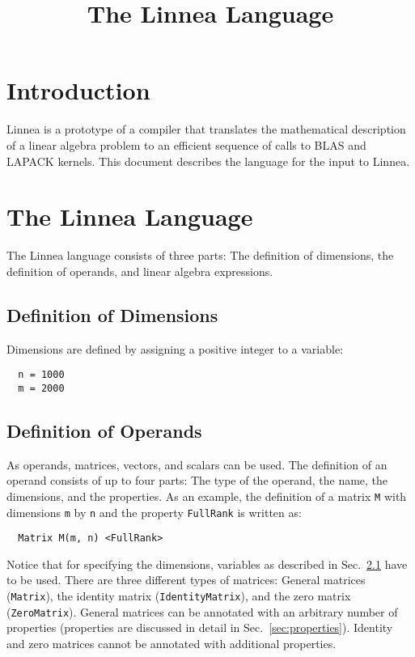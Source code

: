 \documentclass[
  12pt,
  a4paper,
]{scrartcl}
\title{The Linnea Language}
\begin{document}
\maketitle

\section{Introduction}

Linnea is a prototype of a compiler that translates the mathematical description of a linear algebra problem to an efficient sequence of calls to BLAS and LAPACK kernels.
This document describes the language for the input to Linnea.

\section{The Linnea Language}

The Linnea language consists of three parts: The definition of dimensions, the definition of operands, and linear algebra expressions.

\subsection{Definition of Dimensions}
\label{sec:defdimensions}

Dimensions are defined by assigning a positive integer to a variable:
\begin{verbatim}
  n = 1000
  m = 2000
\end{verbatim} 

\subsection{Definition of Operands}

As operands, matrices, vectors, and scalars can be used. The definition of an operand consists of up to four parts: The type of the operand, the name, the dimensions, and the properties. As an example, the definition of a matrix \texttt{M} with dimensions \texttt{m} by \texttt{n} and the property \texttt{FullRank} is written as:
\begin{verbatim}
  Matrix M(m, n) <FullRank>	
\end{verbatim}
Notice that for specifying the dimensions, variables as described in Sec.~\ref{sec:defdimensions} have to be used.
There are three different types of matrices: General matrices (\texttt{Matrix}), the identity matrix (\texttt{IdentityMatrix}), and the zero matrix (\texttt{ZeroMatrix}). General matrices can be annotated with an arbitrary number of properties (properties are discussed in detail in Sec.~\ref{sec:properties}). Identity and zero matrices cannot be annotated with additional properties.
\end{document}
